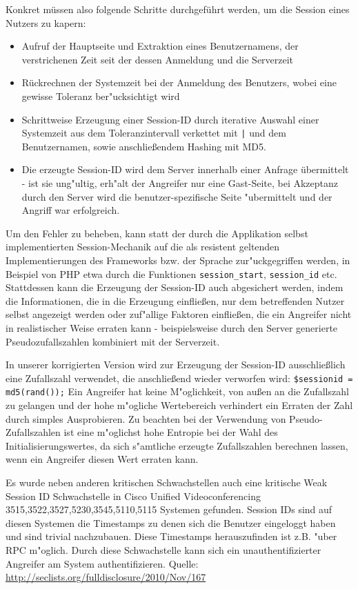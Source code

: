 \documentclass[12pt,a4paper,titlepage,oneside]{scrartcl}
\begin{document}
Konkret müssen also folgende Schritte durchgeführt werden, um die Session eines Nutzers zu kapern:

\begin{itemize}
\item Aufruf der Hauptseite und Extraktion eines Benutzernamens, der verstrichenen Zeit seit der dessen Anmeldung und die Serverzeit
\item Rückrechnen der Systemzeit bei der Anmeldung des Benutzers, wobei eine gewisse Toleranz ber"ucksichtigt wird
\item Schrittweise Erzeugung einer Session-ID durch iterative Auswahl einer Systemzeit aus dem Toleranzintervall verkettet mit \texttt{|} und dem Benutzernamen, sowie anschließendem Hashing mit MD5.
\item Die erzeugte Session-ID wird dem Server innerhalb einer Anfrage übermittelt - ist sie ung"ultig, erh"alt der Angreifer nur eine Gast-Seite, bei Akzeptanz durch den Server wird die benutzer-spezifische Seite "ubermittelt und der Angriff war erfolgreich.
\end{itemize}

Um den Fehler zu beheben, kann statt der durch die Applikation selbst implementierten Session-Mechanik auf die als resistent geltenden Implementierungen des Frameworks bzw. der Sprache zur"uckgegriffen werden, in Beispiel von PHP etwa durch die Funktionen \texttt{session\_start}, \texttt{session\_id} etc. Stattdessen kann die Erzeugung der Session-ID auch abgesichert werden, indem die Informationen, die in die Erzeugung einfließen, nur dem betreffenden Nutzer selbst angezeigt werden oder zuf"allige Faktoren einfließen, die ein Angreifer nicht in realistischer Weise erraten kann - beispielsweise durch den Server generierte Pseudozufallszahlen kombiniert mit der Serverzeit. 

In unserer korrigierten Version wird zur Erzeugung der Session-ID ausschließlich eine Zufallszahl verwendet, die anschließend wieder verworfen wird: \lstinline{$sessionid = md5(rand());} Ein Angreifer hat keine M"oglichkeit, von außen an die Zufallszahl zu gelangen und der hohe m"ogliche Wertebereich verhindert ein Erraten der Zahl durch simples Ausprobieren. Zu beachten bei der Verwendung von Pseudo-Zufallszahlen ist eine m"oglichst hohe Entropie bei der Wahl des Initialisierungswertes, da sich s"amtliche erzeugte Zufallszahlen berechnen lassen, wenn ein Angreifer diesen Wert erraten kann.

Es wurde neben anderen kritischen Schwachstellen auch eine kritische Weak Session ID Schwachstelle in Cisco Unified Videoconferencing 3515,3522,3527,5230,3545,5110,5115 Systemen gefunden. Session IDs sind auf diesen Systemen die Timestamps zu denen sich die Benutzer eingeloggt haben und sind trivial nachzubauen. Diese Timestamps herauszufinden ist z.B. "uber RPC m"oglich. Durch diese Schwachstelle kann sich ein unauthentifizierter Angreifer am System authentifizieren.\newline
Quelle: \url{http://seclists.org/fulldisclosure/2010/Nov/167}
\end{document}
